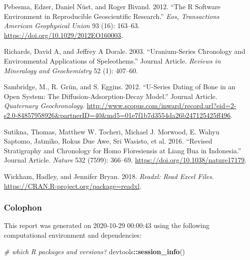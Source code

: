 \documentclass[]{elsarticle} %
\newenvironment{Shaded}{\begin{snugshade}}{\end{snugshade}}
\newcommand{\CommentTok}[1]{\textcolor[rgb]{0.56,0.35,0.01}{\textit{#1}}}
\newcommand{\KeywordTok}[1]{\textcolor[rgb]{0.13,0.29,0.53}{\textbf{#1}}}
\newcommand{\NormalTok}[1]{#1}
\newcommand{\OperatorTok}[1]{\textcolor[rgb]{0.81,0.36,0.00}{\textbf{#1}}}
\newlength{\cslhangindent}
\newenvironment{cslreferences}%
  {\setlength{\parindent}{0pt}%
  \everypar{\setlength{\hangindent}{\cslhangindent}}\ignorespaces}%
  {\par}
\begin{document}
\begin{cslreferences}
\leavevmode\hypertarget{ref-Pebesma_Nust_Bivand_2012}{}%
Pebesma, Edzer, Daniel Nüst, and Roger Bivand. 2012. ``The R Software Environment in Reproducible Geoscientific Research.'' \emph{Eos, Transactions American Geophysical Union} 93 (16): 163--63. \url{https://doi.org/10.1029/2012EO160003}.

\leavevmode\hypertarget{ref-RN4494}{}%
Richards, David A, and Jeffrey A Dorale. 2003. ``Uranium-Series Chronology and Environmental Applications of Speleothems.'' Journal Article. \emph{Reviews in Mineralogy and Geochemistry} 52 (1): 407--60.

\leavevmode\hypertarget{ref-Sambridge2012}{}%
Sambridge, M., R. Grün, and S. Eggins. 2012. ``U-Series Dating of Bone in an Open System: The Diffusion-Adsorption-Decay Model.'' Journal Article. \emph{Quaternary Geochronology}. \url{http://www.scopus.com/inward/record.url?eid=2-s2.0-84857958926\&partnerID=40\&md5=01e7f1b7d3554da26b247125425ff496}.

\leavevmode\hypertarget{ref-Sutikna2016}{}%
Sutikna, Thomas, Matthew W. Tocheri, Michael J. Morwood, E. Wahyu Saptomo, Jatmiko, Rokus Due Awe, Sri Wasisto, et al. 2016. ``Revised Stratigraphy and Chronology for Homo Floresiensis at Liang Bua in Indonesia.'' Journal Article. \emph{Nature} 532 (7599): 366--69. \url{https://doi.org/10.1038/nature17179}.

\leavevmode\hypertarget{ref-Wickham_readxl}{}%
Wickham, Hadley, and Jennifer Bryan. 2018. \emph{Readxl: Read Excel Files}. \url{https://CRAN.R-project.org/package=readxl}.
\end{cslreferences}

\newpage

\hypertarget{colophon}{%
\subsubsection{Colophon}\label{colophon}}

This report was generated on 2020-10-29 00:00:43 using the following computational environment and dependencies:

\begin{Shaded}
\begin{Highlighting}[]
\CommentTok{\# which R packages and versions?}
\NormalTok{devtools}\OperatorTok{::}\KeywordTok{session\_info}\NormalTok{()}
\end{Highlighting}
\end{Shaded}
\end{document}
